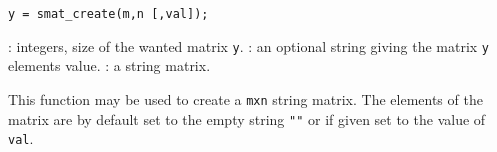 
\begin{mandesc}
\end{mandesc}

\begin{calling_sequence}
\begin{verbatim}
y = smat_create(m,n [,val]);
\end{verbatim}
\end{calling_sequence}
\begin{parameters}
  \begin{varlist}
     : integers, size of the wanted matrix \verb!y!.
     : an optional string giving the matrix \verb!y! elements value.
       : a string matrix.
  \end{varlist}
\end{parameters}

\begin{mandescription}
  This function may be used to create a \verb+mxn+ string matrix. 
  The elements of the matrix are by default set to the empty string \verb+""+ 
  or if given set to the value of \verb+val+.
\end{mandescription}

\begin{examples}
  \begin{program}
  \end{program}
\end{examples}

